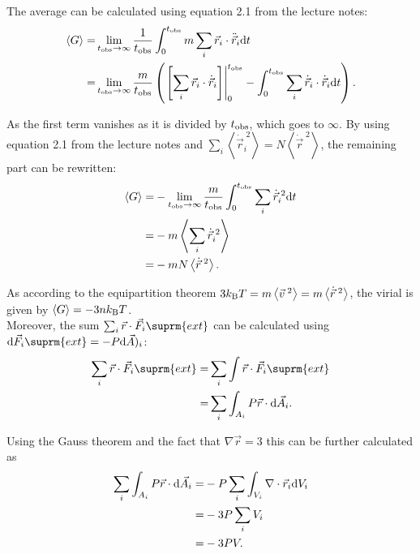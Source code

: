 \documentclass[titlepage]{report}
\begin{document}
The average can be calculated using equation 2.1 from the lecture notes:
\begin{subequations}
	\begin{align}
	\langle G \rangle =& \lim\limits_{t_{\rm{obs}} \rightarrow \infty} \frac{1}{t_{\rm{obs}}} \int_{0}^{t_{\rm{obs}}} m \sum_i \vec{r}_i \cdot \ddot{\vec{r}}_i \mathrm{d} t\\
	=& \lim\limits_{t_{\rm{obs}} \rightarrow \infty} \frac{m}{t_{\rm{obs}}} \left( \left. \left[\sum_i \vec{r}_i \cdot \dot{\vec{r}}_i \right] \right|_0^{t_{\rm{obs}}} - \int_{0}^{t_{\rm{obs}}} \sum_i \dot{\vec{r}}_i \cdot \dot{\vec{r}}_i \mathrm{d} t \right).
	\end{align}
\end{subequations}

As the first term vanishes as it is divided by $ t_{\rm{obs}} $, which goes to $ \infty $. By using equation 2.1 from the lecture notes and $ \sum_i \left\langle \dot{\vec{r}}_i^{\;2} \right\rangle = N \left\langle \dot{\vec{r}}^{\;2} \right\rangle $, the remaining part can be rewritten:
\begin{subequations}
	\begin{align}
	\langle G \rangle =& - \lim\limits_{t_{\rm{obs}} \rightarrow \infty} \frac{m}{t_{\rm{obs}}} \int_{0}^{t_{\rm{obs}}} \sum_i \dot{\vec{r}}_i^{\;2} \mathrm{d} t \\
	=& -m \left\langle \sum_i \dot{\vec{r}}_i^{\;2} \right\rangle\\
	=& -m N \left\langle \dot{\vec{r}}^{\;2} \right\rangle.
	\end{align}
\end{subequations}

As according to the equipartition theorem $ 3 k_{\rm{B}} T = m \left\langle \vec{v}^{\;2} \right\rangle = m \left\langle \dot{\vec{r}}^{\;2} \right\rangle $, the virial is given by $ \langle G \rangle = -3 n k_{\rm{B}} T $.\\

Moreover, the sum $ \sum_i \vec{r} \cdot \vec{F}_i\suprm{ext} $ can be calculated using $ \d \vec{F}_i\suprm{ext} = - P \d \vec{A})_i $:
\begin{subequations}
	\begin{align}
		\sum_i \vec{r} \cdot \vec{F}_i\suprm{ext} =& \sum_i \int \vec{r} \cdot \vec{F}_i\suprm{ext}\\
		=& \sum_i \int_{A_i} P \vec{r} \cdot \d\vec{A}_i.
	\end{align}
\end{subequations}

Using the Gauss theorem and the fact that $ \nabla \vec{r} = 3 $ this can be further calculated as
\begin{subequations}
	\begin{align}
		\sum_i \int_{A_i} P \vec{r} \cdot \mathrm{d}\vec{A}_i =& -P \sum_i \int_{V_i} \nabla \cdot \vec{r}_i \mathrm{d} V_i\\
		=& -3 P \sum_i V_i\\
		=& -3 P V.
	\end{align}
\end{subequations}
\end{document}
